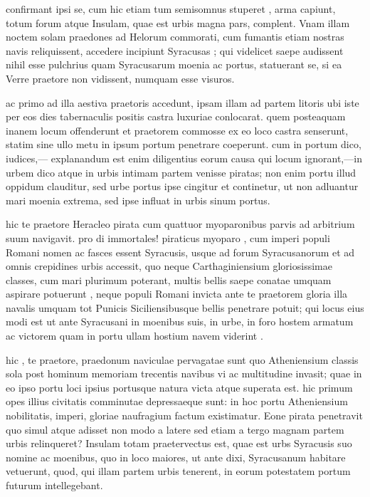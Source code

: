  confirmant ipsi se, cum hic etiam tum semisomnus stuperet , arma capiunt, totum forum atque Insulam, quae est urbis magna pars, complent. Vnam illam noctem solam praedones ad Helorum commorati, cum fumantis etiam nostras navis reliquissent, accedere incipiunt Syracusas ; qui videlicet saepe audissent nihil esse pulchrius quam Syracusarum moenia ac portus, statuerant se, si ea Verre praetore non vidissent, numquam esse visuros.

 ac primo ad illa aestiva praetoris accedunt, ipsam illam ad partem litoris ubi iste per eos dies tabernaculis positis castra luxuriae conlocarat. quem posteaquam inanem locum offenderunt et praetorem commosse ex eo loco castra senserunt, statim sine ullo metu in ipsum portum penetrare coeperunt. cum in portum dico, iudices,— explanandum est enim diligentius eorum causa qui locum ignorant,—in urbem dico atque in urbis intimam partem venisse piratas; non enim portu illud oppidum clauditur, sed urbe portus ipse cingitur et continetur, ut non adluantur mari moenia extrema, sed ipse influat in urbis sinum portus.

 hic te praetore Heracleo pirata cum quattuor myoparonibus parvis ad arbitrium suum navigavit. pro di immortales! piraticus myoparo , cum imperi populi Romani nomen ac fasces essent Syracusis, usque ad forum Syracusanorum et ad omnis crepidines urbis accessit, quo neque Carthaginiensium gloriosissimae classes, cum mari plurimum poterant, multis bellis saepe conatae umquam aspirare potuerunt , neque populi Romani invicta ante te praetorem gloria illa navalis umquam tot Punicis Siciliensibusque bellis penetrare potuit; qui locus eius modi est ut ante Syracusani in moenibus suis, in urbe, in foro hostem armatum ac victorem quam in portu ullam hostium navem viderint .

 hic , te praetore, praedonum naviculae pervagatae sunt quo Atheniensium classis sola post hominum memoriam trecentis navibus vi ac multitudine invasit; quae in eo ipso portu loci ipsius portusque natura victa atque superata est. hic primum opes illius civitatis comminutae depressaeque sunt: in hoc portu Atheniensium nobilitatis, imperi, gloriae naufragium factum existimatur. Eone pirata penetravit quo simul atque adisset non modo a latere sed etiam a tergo magnam partem urbis relinqueret? Insulam totam praetervectus est, quae est urbs Syracusis suo nomine ac moenibus, quo in loco maiores, ut ante dixi, Syracusanum habitare vetuerunt, quod, qui illam partem urbis tenerent, in eorum potestatem portum futurum intellegebant.

